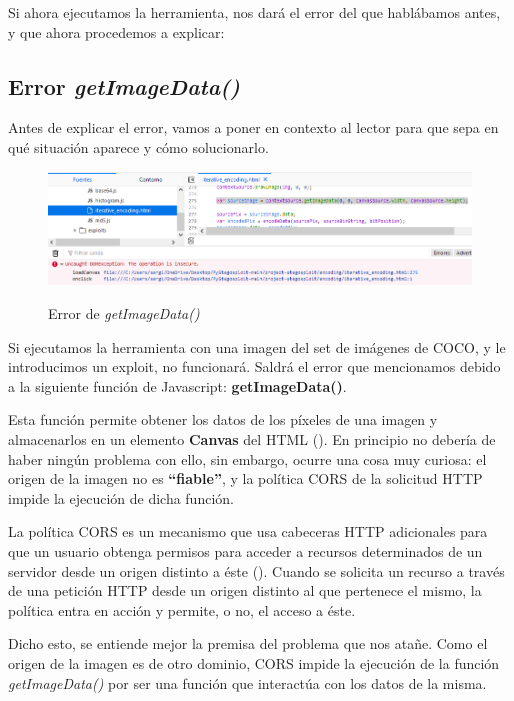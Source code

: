 Si ahora ejecutamos la herramienta, nos dará el error del que hablábamos antes, y que ahora procedemos a explicar:

\subsection{Error \textit{getImageData()}}

Antes de explicar el error, vamos a poner en contexto al lector para que sepa en qué situación aparece y cómo solucionarlo.

\begin{figure}[H]
  \centering
  \includegraphics[width=\linewidth]{Figuras/Implementacion/getimagedata.png}
  \label{fig:getimagedata}
  \caption{Error de \textit{getImageData()}}
\end{figure}

Si ejecutamos la herramienta con una imagen del set de imágenes de COCO, y le introducimos un exploit, no funcionará. Saldrá el error que mencionamos debido a la siguiente función de Javascript: \textbf{getImageData()}.

Esta función permite obtener los datos de los píxeles de una imagen y almacenarlos en un elemento \textbf{Canvas} del HTML (\cite{getimagedata}). En principio no debería de haber ningún problema con ello, sin embargo, ocurre una cosa muy curiosa: el origen de la imagen no es \textbf{``fiable''}, y la política \ac{CORS} de la solicitud HTTP impide la ejecución de dicha función. %

La política \ac{CORS} es un mecanismo que usa cabeceras HTTP adicionales para que un usuario obtenga permisos para acceder a recursos determinados de un servidor desde un origen distinto a éste (\cite{CORS}). Cuando se solicita un recurso a través de una petición HTTP desde un origen distinto al que pertenece el mismo, la política entra en acción y permite, o no, el acceso a éste. %

Dicho esto, se entiende mejor la premisa del problema que nos atañe. Como el origen de la imagen es de otro dominio, \ac{CORS} impide la ejecución de la función \textit{getImageData()} por ser una función que interactúa con los datos de la misma.

